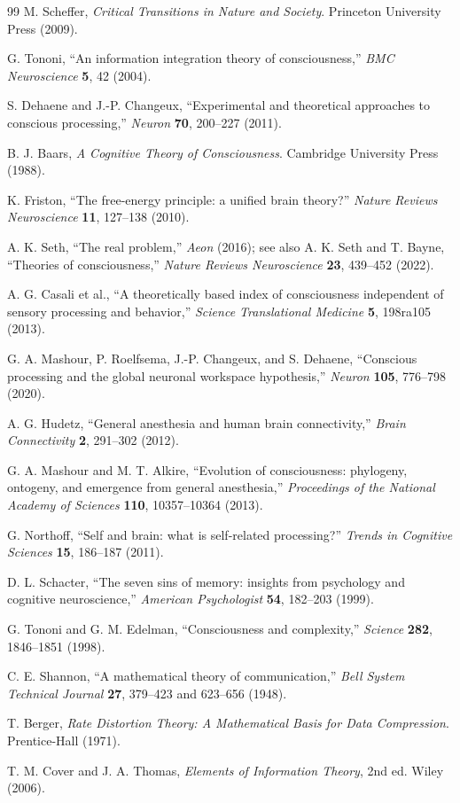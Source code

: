 \documentclass[10pt,a4paper,twocolumn,aps,prl]{revtex4-2}
\theoremstyle{claimstyle}
\theoremstyle{definition}
\begin{document}
\begin{thebibliography}{99}
M. Scheffer, \textit{Critical Transitions in Nature and Society}. Princeton University Press (2009).

G. Tononi, ``An information integration theory of consciousness,'' \textit{BMC Neuroscience} \textbf{5}, 42 (2004).

S. Dehaene and J.-P. Changeux, ``Experimental and theoretical approaches to conscious processing,'' \textit{Neuron} \textbf{70}, 200--227 (2011).

B. J. Baars, \textit{A Cognitive Theory of Consciousness}. Cambridge University Press (1988).

K. Friston, ``The free-energy principle: a unified brain theory?'' \textit{Nature Reviews Neuroscience} \textbf{11}, 127--138 (2010).

A. K. Seth, ``The real problem,'' \textit{Aeon} (2016); see also A. K. Seth and T. Bayne, ``Theories of consciousness,'' \textit{Nature Reviews Neuroscience} \textbf{23}, 439--452 (2022).

A. G. Casali et al., ``A theoretically based index of consciousness independent of sensory processing and behavior,'' \textit{Science Translational Medicine} \textbf{5}, 198ra105 (2013).

G. A. Mashour, P. Roelfsema, J.-P. Changeux, and S. Dehaene, ``Conscious processing and the global neuronal workspace hypothesis,'' \textit{Neuron} \textbf{105}, 776--798 (2020).

A. G. Hudetz, ``General anesthesia and human brain connectivity,'' \textit{Brain Connectivity} \textbf{2}, 291--302 (2012).

G. A. Mashour and M. T. Alkire, ``Evolution of consciousness: phylogeny, ontogeny, and emergence from general anesthesia,'' \textit{Proceedings of the National Academy of Sciences} \textbf{110}, 10357--10364 (2013).

G. Northoff, ``Self and brain: what is self-related processing?'' \textit{Trends in Cognitive Sciences} \textbf{15}, 186--187 (2011).

D. L. Schacter, ``The seven sins of memory: insights from psychology and cognitive neuroscience,'' \textit{American Psychologist} \textbf{54}, 182--203 (1999).

G. Tononi and G. M. Edelman, ``Consciousness and complexity,'' \textit{Science} \textbf{282}, 1846--1851 (1998).

C. E. Shannon, ``A mathematical theory of communication,'' \textit{Bell System Technical Journal} \textbf{27}, 379--423 and 623--656 (1948).

T. Berger, \textit{Rate Distortion Theory: A Mathematical Basis for Data Compression}. Prentice-Hall (1971).

T. M. Cover and J. A. Thomas, \textit{Elements of Information Theory}, 2nd ed. Wiley (2006).

\end{thebibliography}
\end{document}

